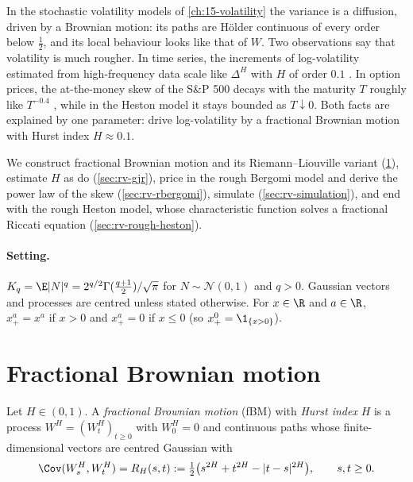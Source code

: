 
In the stochastic volatility models of \cref{ch:15-volatility} the variance is a diffusion, driven by a
Brownian motion: its paths are H\"older continuous of every order below $\frac12$, and its local
behaviour looks like that of $W$. Two observations say that volatility is much rougher. In time series,
the increments of log-volatility estimated from high-frequency data scale like $\Delta^H$ with $H$ of
order $0.1$ \citep{gatheral-jaisson-rosenbaum-2018}. In option prices, the at-the-money skew of the S\&P
500 decays with the maturity $T$ roughly like $T^{-0.4}$ \citep{bayer-friz-gatheral-2016}, while in the
Heston model it stays bounded as $T\downarrow0$. Both facts are explained by one parameter: drive
log-volatility by a fractional Brownian motion with Hurst index $H\approx0.1$.

We construct fractional Brownian motion and its Riemann--Liouville variant (\cref{sec:rv-fbm}),
estimate $H$ as \textcite{gatheral-jaisson-rosenbaum-2018} do (\cref{sec:rv-gjr}), price in the rough
Bergomi model and derive the power law of the skew (\cref{sec:rv-rbergomi}), simulate
(\cref{sec:rv-simulation}), and end with the rough Heston model, whose characteristic function solves a
fractional Riccati equation (\cref{sec:rv-rough-heston}).

\paragraph{Setting.} $K_q=\E|N|^q=2^{q/2}\Gamma(\frac{q+1}2)/\sqrt\pi$ for $N\sim\mathcal N(0,1)$ and
$q>0$. Gaussian vectors and processes are centred unless stated otherwise. For $x\in\R$ and
$a\in\R$, $x_+^a=x^a$ if $x>0$ and $x_+^a=0$ if $x\le0$ (so $x_+^0=\1_{\{x>0\}}$).

\section{Fractional Brownian motion}\label{sec:rv-fbm}

\begin{definition}\label{def:rv-fbm}
Let $H\in(0,1)$. A \emph{fractional Brownian motion} (fBM) with \emph{Hurst index} $H$ is a process
$W^H=(W^H_t)_{t\ge0}$ with $W^H_0=0$ and continuous paths whose finite-dimensional vectors are centred
Gaussian with
\begin{equation}\label{eq:rv-fbm-cov}
  \Cov(W^H_s,W^H_t)=R_H(s,t):=\tfrac12\big(s^{2H}+t^{2H}-|t-s|^{2H}\big),\qquad s,t\ge0 .
\end{equation}
\end{definition}

